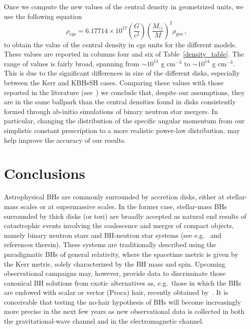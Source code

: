 \documentclass[twocolumn,aps,showpacs,showkeys,prd,superscriptaddress,byrevtex, amsmath]{revtex4-1}
\begin{document}
Once we compute the new values of the central density in geometrized units, we use the following equation~\cite{RezzollaBook}
\begin{equation}
\rho_{\mathrm{cgs}} = 6.17714 \times 10^{17} \left(\frac{G}{c^2}\right)\left(\frac{M_{\odot}}{M}\right)^2 \rho_{\mathrm{geo}}\,,
\end{equation}
to obtain the value of the central density in cgs units for the different models. These values are reported in columns four and six of Table~\ref{density_table}. The range of values is fairly broad, spanning from $\sim10^{11}$ g cm$^{-3}$ to $\sim10^{14}$ g cm$^{-3}$. This is due to the significant differences in size of the different disks, especially between the Kerr and KBHsSH cases. Comparing these values with those reported in the literature (see~\cite{Rezzolla:2010,Rezzolla:2017}) we conclude that, despite our assumptions, they are in the same ballpark than the central densities found in disks consistently formed through ab-initio simulations of binary neutron star mergers. In particular, changing the distribution of the specific angular momentum from our simplistic constant prescription to a more realistic power-law distribution, may help improve the accuracy of our results. 

\section{Conclusions}
\label{conclusions}

Astrophysical BHs are commonly surrounded by accretion disks, either at stellar-mass scales or at supermassive scales. In the former case, stellar-mass BHs surrounded by thick disks (or tori) are broadly accepted as natural end results of catastrophic events involving the coalescence and merger of compact objects, namely binary neutron stars and BH-neutron star systems (see e.g.~\cite{FaberRasio2012,Paschalidis:2016agf,Rezzolla:2017} and references therein). These systems are traditionally described using the paradigmatic BHs of general relativity, where the spacetime metric is given by the Kerr metric, solely characterized by the BH mass and spin. Upcoming observational campaigns may, however, provide data to discriminate those canonical BH solutions from exotic alternatives as, e.g.~those in which the BHs are endowed with scalar or vector (Proca) hair, recently obtained by~\cite{Herdeiro:2014a,Herdeiro:2016}. It is conceivable that testing the no-hair hypothesis of BHs will become increasingly more precise in the next few years as new observational data is collected in both the gravitational-wave channel and in the electromagnetic channel.
\end{document}
